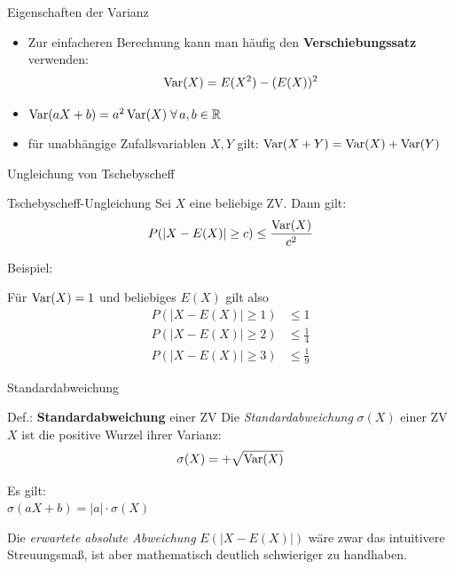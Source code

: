 \documentclass[
  10pt,
  ignorenonframetext,
]{beamer}
\providecommand{\tightlist}{%
  \setlength{\itemsep}{0pt}\setlength{\parskip}{0pt}}
\begin{document}
\begin{frame}{Eigenschaften der Varianz}
\label{eigenschaften-der-varianz}
\begin{itemize}
\tightlist
\item
  Zur einfacheren Berechnung kann man häufig den
  \textbf{Verschiebungssatz} verwenden: \[\operatorname{Var}(X) = E(X^2) -(E(X))^2\]
\item
  \(\operatorname{Var}(aX + b) = a^2 \operatorname{Var}(X) \;\forall\, a,b\in \mathbb{R}\)
\item
  für unabhängige Zufallsvariablen \(X, Y\) gilt:
  \(\operatorname{Var}(X + Y) = \operatorname{Var}(X) + \operatorname{Var}(Y)\)
\end{itemize}
\end{frame}

\begin{frame}{Ungleichung von Tschebyscheff}
\label{ungleichung-von-tschebyscheff}
\begin{block}{Tschebyscheff-Ungleichung}
\label{tschebyscheff-ungleichung}
Sei \(X\) eine beliebige ZV. Dann gilt: \[
P(|X - E(X)| \geq c) \leq \frac{\operatorname{Var}(X)}{c^2}
\]
\end{block}

Beispiel:

Für \(\operatorname{Var}(X)=1\) und beliebiges \(E(X)\) gilt also \begin{align*}
P(|X - E(X)| \geq 1) &\leq  1 \\
P(|X - E(X)| \geq 2) &\leq  \frac{1}{4} \\
P(|X - E(X)| \geq 3) &\leq  \frac{1}{9}
\end{align*}
\end{frame}

\begin{frame}{Standardabweichung}
\label{standardabweichung}
\begin{block}{Def.: \textbf{Standardabweichung} einer ZV}
\label{def.-standardabweichung-einer-zv}
Die \emph{Standardabweichung} \(\sigma(X)\) einer ZV \(X\) ist die
positive Wurzel ihrer Varianz: \[
\sigma(X) = + \sqrt{\operatorname{Var}(X)}
\]
\end{block}

Es gilt:\\
\(\sigma(aX + b) = |a| \cdot \sigma(X)\) ~ ~

Die \emph{erwartete absolute Abweichung} \(E(|X - E(X)|)\) wäre zwar das
intuitivere Streuungsmaß, ist aber mathematisch deutlich schwieriger zu
handhaben.

\end{frame}
\end{document}
